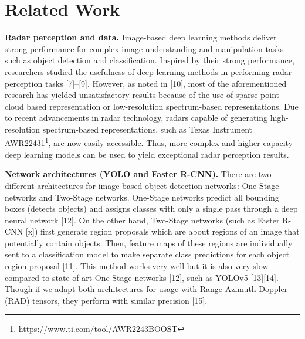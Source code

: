 \documentclass{article}
\begin{document}
\section{Related Work}
\textbf{Radar perception and data.} Image-based deep learning methods deliver strong performance for complex image understanding and manipulation tasks such as object detection and classification. Inspired by their strong performance, researchers studied the usefulness of deep learning methods in performing radar perception tasks [7]–[9]. However, as noted in [10], most of the aforementioned research has yielded unsatisfactory results because of the use of sparse point-cloud based representation or low-resolution spectrum-based representations. Due to recent advancements in radar technology, radars capable of generating high-resolution spectrum-based representations, such as Texas Instrument AWR22431\footnote{https://www.ti.com/tool/AWR2243BOOST}, are now easily accessible. Thus, more complex and higher capacity deep learning models can be used to yield exceptional radar perception results.

\textbf{Network architectures (YOLO and Faster R-CNN).} There are two different architectures for image-based object detection networks: One-Stage networks and Two-Stage networks. One-Stage networks predict all bounding boxes (detects objects) and assigns classes with only a single pass through a deep neural network [12]. On the other hand, Two-Stage networks (such as Faster R-CNN [x]) first generate region proposals which are about regions of an image that potentially contain objects. Then, feature maps of these regions are individually sent to a classification model to make separate class predictions for each object region proposal [11]. This method works very well but it is also very slow compared to state-of-art One-Stage networks [12], such as YOLOv5 [13][14]. Though if we adapt both architectures for usage with Range-Azimuth-Doppler (RAD) tensors, they perform with similar precision [15].
\end{document}
